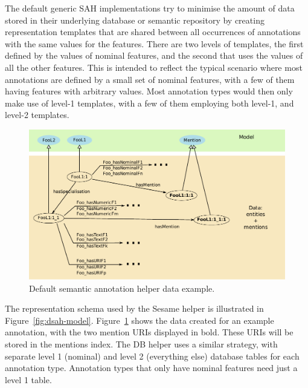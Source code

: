 The default generic SAH implementations try to minimise the amount of data stored in their underlying database or semantic repository
by creating representation templates that are shared
between all occurrences of annotations with the same values for the features.
There are two levels of templates, the first defined by the values of nominal
features, and the second that uses the values of all the other features. This
is intended to reflect the typical scenario where most annotations are defined
by a small set of nominal features, with a few of them having features with
arbitrary values. Most annotation types would then only make use of level-1
templates, with a few of them employing both level-1, and level-2 templates.

\begin{figure}[htb]
\begin{center}
\includegraphics[scale=0.66]{img/dsah-data}
\caption{Default semantic annotation helper data example.}
\label{fig:dsah-data}
\end{center}
\end{figure}

The representation schema used by the Sesame helper is illustrated in
Figure~\ref{fig:dsah-model}.  Figure~\ref{fig:dsah-data} shows the data created
for an example annotation, with the two mention URIs displayed in bold. These
URIs will be stored in the mentions index.  The DB helper uses a similar
strategy, with separate level 1 (nominal) and level 2 (everything else)
database tables for each annotation type.  Annotation types that only have
nominal features need just a level 1 table.

